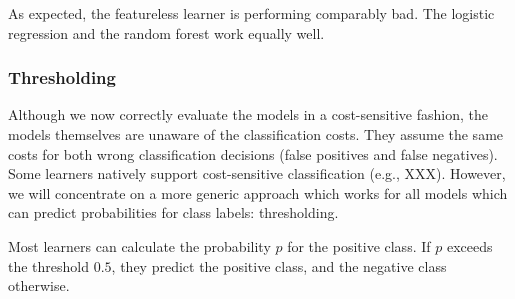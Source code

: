\documentclass[]{article}
\newenvironment{Shaded}{}{}
\newcommand{\DataTypeTok}[1]{#1}
\newcommand{\DecValTok}[1]{#1}
\newcommand{\KeywordTok}[1]{\textcolor[rgb]{0.00,0.00,1.00}{#1}}
\newcommand{\NormalTok}[1]{#1}
\newcommand{\OperatorTok}[1]{#1}
\newcommand{\StringTok}[1]{\textcolor[rgb]{0.00,0.50,0.50}{#1}}
\renewenvironment{Shaded} {\begin{snugshade}\small} {\end{snugshade}}
\begin{document}
\begin{Shaded}
\end{Shaded}

As expected, the featureless learner is performing comparably bad.
The logistic regression and the random forest work equally well.

\hypertarget{thresholding}{%
\subsubsection{Thresholding}\label{thresholding}}

Although we now correctly evaluate the models in a cost-sensitive fashion, the models themselves are unaware of the classification costs.
They assume the same costs for both wrong classification decisions (false positives and false negatives).
Some learners natively support cost-sensitive classification (e.g., XXX).
However, we will concentrate on a more generic approach which works for all models which can predict probabilities for class labels: thresholding.

Most learners can calculate the probability \(p\) for the positive class.
If \(p\) exceeds the threshold \(0.5\), they predict the positive class, and the negative class otherwise.
\end{document}
